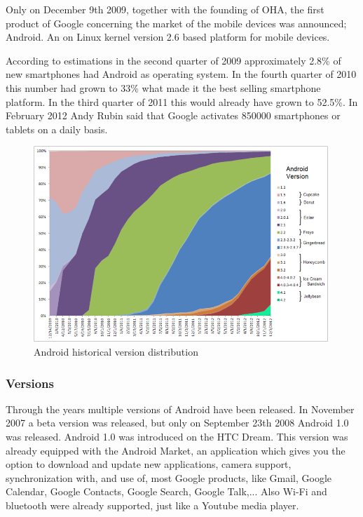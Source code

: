 \documentclass[a4paper,12pt]{report}
\begin{document}
Only on December 9th 2009, together with the founding of OHA, the first product of Google concerning the market of the mobile devices was announced; Android. An on Linux 
kernel version 2.6 based platform for mobile devices.

According to estimations in the second quarter of 2009 approximately  2.8\% of new smartphones had Android as operating system. In the fourth quarter of 2010 this number
had grown to 33\% what made it the best selling smartphone platform. In the third quarter of 2011 this would already have grown to 52.5\%. In February 2012 Andy Rubin
said that Google activates 850000 smartphones or tablets on a daily basis. 
\begin{figure}
  \centering
    \includegraphics[width=0.99\textwidth]{images/Android_historical_version_distribution.png}
  \caption{Android historical version distribution}
\end{figure}

\subsubsection{Versions}
Through the years multiple versions of Android have been released. In November 2007 a beta version was released, but only on September 23th 2008 Android 1.0 was released.
Android 1.0 was introduced on the HTC Dream. This version was already equipped with the Android Market, an application which gives you the option to download and update
new applications, camera support, synchronization with, and use of, most Google products, like Gmail, Google Calendar, Google Contacts, Google Search, Google Talk,... 
Also Wi-Fi and bluetooth were already supported, just like a Youtube media player.
\end{document}
